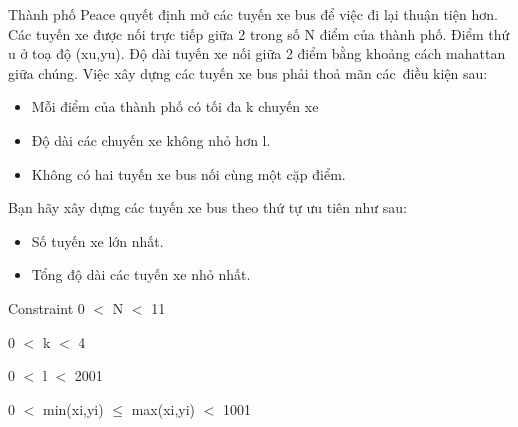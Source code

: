 Thành phố Peace quyết định mở các tuyến xe bus để việc đi lại thuận tiện hơn. Các tuyến xe được nối trực tiếp giữa 2 trong số N điểm của thành phố. Điểm thứ u ở toạ độ (xu,yu). Độ dài tuyến xe nối giữa 2 điểm bằng khoảng cách mahattan giữa chúng. Việc xây dựng các tuyến xe bus phải thoả mãn các điều kiện sau:
\begin{itemize}
	\item Mỗi điểm của thành phố có tối đa k chuyến xe
	\item Độ dài các chuyến xe không nhỏ hơn l.
	\item Không có hai tuyến xe bus nối cùng một cặp điểm.
\end{itemize}

Bạn hãy xây dựng các tuyến xe bus theo thứ tự ưu tiên như sau:
\begin{itemize}
	\item Số tuyến xe lớn nhất.
	\item Tổng độ dài các tuyến xe nhỏ nhất.
\end{itemize}
Constraint
0 $<$ N $<$ 11

0 $<$ k $<$ 4

0 $<$ l $<$ 2001

0 $<$ min(xi,yi)  $\le$  max(xi,yi) $<$ 1001